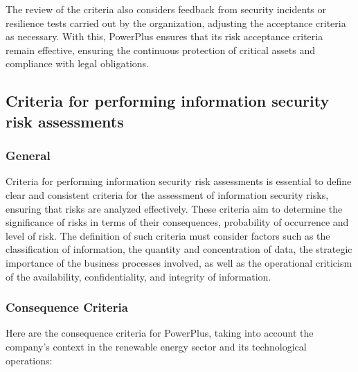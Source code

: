 The review of the criteria also considers feedback from security incidents or resilience tests carried out by the organization, adjusting the acceptance criteria as necessary. With this, PowerPlus ensures that its risk acceptance criteria remain effective, ensuring the continuous protection of critical assets and compliance with legal obligations.


\subsection{Criteria for performing information security risk assessments}

\subsubsection{General}

Criteria for performing information security risk assessments is essential to define clear and consistent criteria for the assessment of information security risks, ensuring that risks are analyzed effectively. These criteria aim to determine the significance of risks in terms of their consequences, probability of occurrence and level of risk. The definition of such criteria must consider factors such as the classification of information, the quantity and concentration of data, the strategic importance of the business processes involved, as well as the operational criticism of the availability, confidentiality, and integrity of information.

\subsubsection{Consequence Criteria}

Here are the consequence criteria for PowerPlus, taking into account the company's context in the renewable energy sector and its technological operations:

